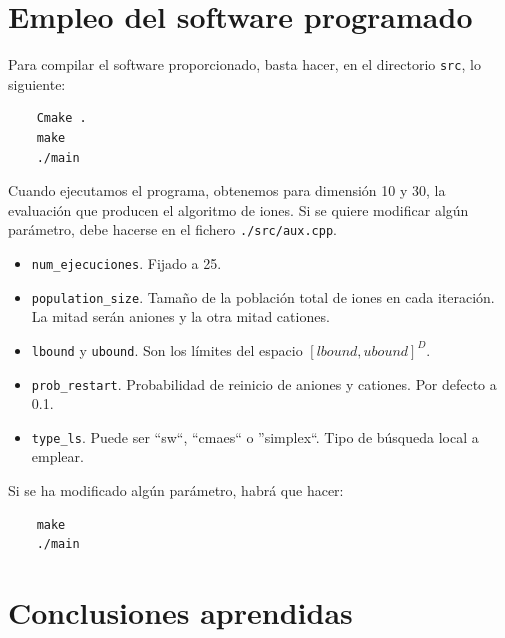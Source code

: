 \documentclass[a4paper,11pt]{article}
\begin{document}
\section{Empleo del software programado}

Para compilar el software proporcionado, basta hacer, en el directorio \texttt{src}, lo siguiente:

\begin{verbatim}
    Cmake .
    make
    ./main
\end{verbatim}

Cuando ejecutamos el programa, obtenemos para dimensión 10 y 30, la evaluación que producen el algoritmo de iones.
Si se quiere modificar algún parámetro, debe hacerse en el fichero \texttt{./src/aux.cpp}. 

\begin{itemize}
 \item \texttt{num\_ejecuciones}. Fijado a 25.
 \item \texttt{population\_size}. Tamaño de la población total de iones en cada iteración. La mitad serán aniones y la otra
 mitad cationes.
 \item \texttt{lbound} y \texttt{ubound}. Son los límites del espacio $[lbound, ubound]^D$.
 \item \texttt{prob\_restart}. Probabilidad de reinicio de aniones y cationes. Por defecto a 0.1.
 \item \texttt{type\_ls}. Puede ser ``sw``, ``cmaes`` o ''simplex``. Tipo de búsqueda local a emplear.
\end{itemize}

Si se ha modificado algún parámetro, habrá que hacer:
\begin{verbatim}
    make
    ./main
\end{verbatim}



\section{Conclusiones aprendidas}
\end{document}
